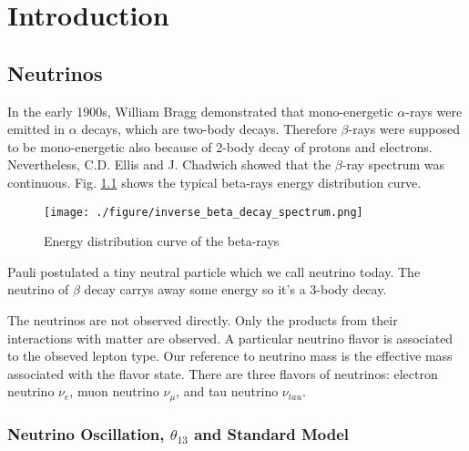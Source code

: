 
\chapter{Introduction}

\section{Neutrinos}

In the early 1900s, William Bragg demonstrated that mono-energetic $\alpha$-rays
were emitted in $\alpha$ decays, which are two-body decays. Therefore $\beta$-rays
were supposed to be mono-energetic also because of 2-body decay of protons and
electrons. Nevertheless, C.D. Ellis and J. Chadwich showed that the $\beta$-ray
spectrum was continuous. Fig. \ref{fig:inverse_beta_decay_spectrum.png} shows the typical beta-rays energy distribution curve.


\begin{figure}
    \centering
    \texttt{[image: ./figure/inverse\_beta\_decay\_spectrum.png]}
    \caption{Energy distribution curve of the beta-rays \cite{Scott:1935}}
    \label{fig:inverse_beta_decay_spectrum.png}
    \end{figure}


Pauli postulated a tiny neutral particle which we call neutrino today. The neutrino
of $\beta$ decay carrys away some energy so it's a 3-body decay.

The neutrinos are not observed directly. Only the products from their interactions
with matter are observed. A particular neutrino flavor is associated to the obseved lepton type.
Our reference to neutrino mass is the effective mass
associated with the flavor state.
There are three flavors of neutrinos: electron neutrino $\nu_e$, muon neutrino $\nu_{\mu}$, and
tau neutrino $\nu_{tau}$.




\subsection{Neutrino Oscillation, $\theta_{13}$ and Standard Model}




